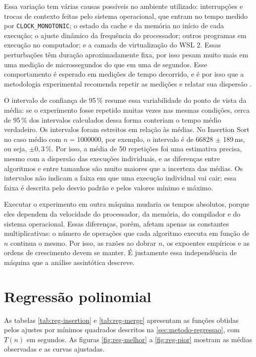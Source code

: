 \documentclass[
    12pt,
    oneside,
    a4paper,
    openany,
    chapter=TITLE,
    english,
    brazil
]{abntex2}
\begin{document}
Essa variação tem várias causas possíveis no ambiente utilizado: interrupções e trocas de contexto feitas pelo sistema operacional, que entram no tempo medido por \texttt{CLOCK\_MONOTONIC}; o estado da cache e da memória no início de cada execução; o ajuste dinâmico da frequência do processador; outros programas em execução no computador; e a camada de virtualização do WSL 2. Essas perturbações têm duração aproximadamente fixa, por isso pesam muito mais em uma medição de microssegundos do que em uma de segundos. Esse comportamento é esperado em medições de tempo decorrido, e é por isso que a metodologia experimental recomenda repetir as medições e relatar sua dispersão \cite{johnson2002,mcgeoch2012}.

O intervalo de confiança de 95\,\% resume essa variabilidade do ponto de vista da média: se o experimento fosse repetido muitas vezes nas mesmas condições, cerca de 95\,\% dos intervalos calculados dessa forma conteriam o tempo médio verdadeiro. Os intervalos foram estreitos em relação às médias. No Insertion Sort no caso médio com $n = \num{1000000}$, por exemplo, o intervalo é de \num{66828} $\pm$ 189\,ms, ou seja, $\pm 0{,}3\,\%$. Por isso, a média de 50 repetições foi uma estimativa precisa, mesmo com a dispersão das execuções individuais, e as diferenças entre algoritmos e entre tamanhos são muito maiores que a incerteza das médias. Os intervalos não indicam a faixa em que uma execução individual vai cair; essa faixa é descrita pelo desvio padrão e pelos valores mínimo e máximo.

Executar o experimento em outra máquina mudaria os tempos absolutos, porque eles dependem da velocidade do processador, da memória, do compilador e do sistema operacional. Essas diferenças, porém, afetam apenas as constantes multiplicativas: o número de operações que cada algoritmo executa em função de $n$ continua o mesmo. Por isso, as razões ao dobrar $n$, os expoentes empíricos e as ordens de crescimento devem se manter. É justamente essa independência de máquina que a análise assintótica descreve.

\section{Regressão polinomial}
\label{sec:regressao}

As tabelas \ref{tab:reg-insertion} e \ref{tab:reg-merge} apresentam as funções obtidas pelos ajustes por mínimos quadrados descritos na \autoref{sec:metodo-regressao}, com $T(n)$ em segundos. As figuras \ref{fig:reg-melhor} a \ref{fig:reg-pior} mostram as médias observadas e as curvas ajustadas.
\end{document}
